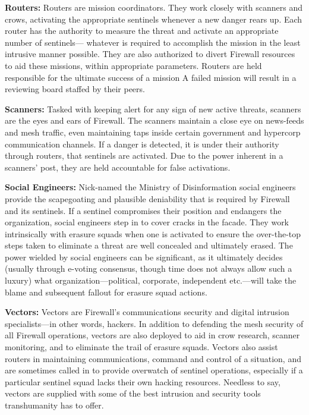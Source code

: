 \textbf{Routers:} Routers are mission coordinators. They 
work closely with scanners and crows, activating the 
appropriate sentinels whenever a new danger rears up. 
Each router has the authority to measure the threat 
and activate an appropriate number of sentinels—
whatever is required to accomplish the mission in 
the least intrusive manner possible. They are also 
authorized to divert Firewall resources to aid these 
missions, within appropriate parameters. Routers are 
held responsible for the ultimate success of a mission
A failed mission will result in a reviewing board
staffed by their peers. 

\textbf{Scanners:} Tasked with keeping alert for any sign of 
new active threats, scanners are the eyes and ears of 
Firewall. The scanners maintain a close eye on news-feeds
and mesh traffic, even maintaining taps inside
certain government and hypercorp communication 
channels. If a danger is detected, it is under their authority
through routers, that sentinels are activated.
Due to the power inherent in a scanners' post, they 
are held accountable for false activations.

\textbf{Social Engineers:} Nick-named the Ministry of Disinformation
social engineers provide the scapegoating
and plausible deniability that is required by Firewall 
and its sentinels. If a sentinel compromises their position
and endangers the organization, social engineers
step in to cover cracks in the facade. They work intrinsically
with erasure squads when one is activated
to ensure the over-the-top steps taken to eliminate a 
threat are well concealed and ultimately erased. The 
power wielded by social engineers can be significant, 
as it ultimately decides (usually through e-voting 
consensus, though time does not always allow such 
a luxury) what organization—political, corporate, independent
etc.—will take the blame and subsequent
fallout for erasure squad actions. 

\textbf{Vectors:} Vectors are Firewall's communications security
and digital intrusion specialists—in other words,
hackers. In addition to defending the mesh security 
of all Firewall operations, vectors are also deployed 
to aid in crow research, scanner monitoring, and to 
eliminate the trail of erasure squads. Vectors also 
assist routers in maintaining communications, command
and control of a situation, and are sometimes
called in to provide overwatch of sentinel operations, 
especially if a particular sentinel squad lacks their 
own hacking resources. Needless to say, vectors are 
supplied with some of the best intrusion and security 
tools transhumanity has to offer.


